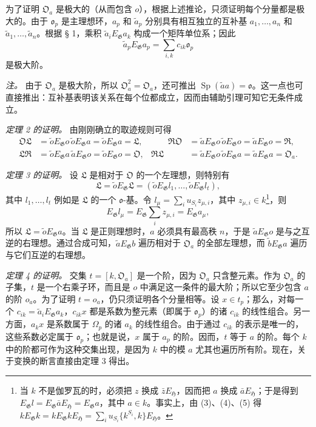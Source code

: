 \documentclass[11pt]{article}
\providecommand{\Gg}{\mathfrak G}
\providecommand{\Hh}{\mathfrak H}
\providecommand{\oo}{\mathfrak o}
\providecommand{\Sp}{\operatorname{Sp}}
\begin{document}
为了证明 \(\mathfrak O_a\) 是极大的（从而包含 \(o\)），根据上述推论，只须证明每个分量都是极大的。由于 \(\oo_p\) 是主理想环，\(a_p\) 和 \(\widetilde a_p\) 分别具有相互独立的互补基 \(a_1,\ldots,a_n\) 和 \(\widetilde a_1,\ldots,\widetilde a_n\)。根据 § 1，乘积 \(\widetilde a_iE_\Gg a_k\) 构成一个矩阵单位系；因此
\[
\widetilde a_pE_\Gg a_p=\sum_{i,k}c_{ik}\oo_p
\]
是极大阶。

\emph{注。} 由于 \(\mathfrak O_a\) 是极大阶，所以 \(\mathfrak O_a^2=\mathfrak O_a\)，还可推出 \(\Sp(\widetilde a a)=\oo\)。这一点也可直接推出：互补基表明该关系在每个位都成立，因而由辅助引理可知它无条件成立。

\medskip
\noindent\emph{定理 2 的证明。} 由刚刚确立的取迹规则可得
\[
\begin{aligned}
\mathfrak O\mathfrak L
 &=\widetilde oE_\Gg o\,\widetilde oE_\Gg a
 =\widetilde oE_\Gg a=\mathfrak L,
&\qquad
\mathfrak R\mathfrak O
 &=\widetilde aE_\Gg o\,\widetilde oE_\Gg o
 =\widetilde aE_\Gg o=\mathfrak R,\\
\mathfrak L\mathfrak R
 &=\widetilde oE_\Gg a\,\widetilde aE_\Gg o
 =\widetilde oE_\Gg o=\mathfrak O,
&
\mathfrak R\mathfrak L
 &=\widetilde aE_\Gg o\,\widetilde oE_\Gg a
 =\widetilde aE_\Gg a=\mathfrak O_a.
\end{aligned}
\]

\medskip
\noindent\emph{定理 3 的证明。} 设 \(\mathfrak L\) 是相对于 \(\mathfrak O\) 的一个左理想，则特别有
\[
\mathfrak L=\widetilde oE_\Gg\mathfrak L
 =(\widetilde oE_\Gg l_1,\ldots,\widetilde oE_\Gg l_t),
\]
其中 \(l_1,\ldots,l_t\) 例如是 \(\mathfrak L\) 的一个 \(\oo\)-基。令 \(l_\mu=\sum_i u_{S_i}z_{\mu,i}\)，其中 \(z_{\mu,i}\in k\)\footnote{当 \(k\) 不是伽罗瓦的时，必须把 \(z\) 换成 \(\bar zE_\Hh\)，因而把 \(a\) 换成 \(\bar aE_\Hh\)；于是得到 \(E_\Gg l=E_\Gg\bar aE_\Hh=E_\Gg a\)，其中 \(a\in k\)。事实上，由 (3)、(4)、(5) 得 \(kE_\Gg k=kE_\Gg kE_\Hh=\sum_i u_{S_i}\{k^{S_i},k\}E_\Hh\)。}，则
\[
E_\Gg l_\mu=E_\Gg\sum_i z_{\mu,i}=E_\Gg a_\mu,
\]
所以 \(\mathfrak L=\widetilde oE_\Gg a\)。当 \(\mathfrak L\) 是正则理想时，\(a\) 必须具有最高秩 \(n\)，于是 \(\widetilde aE_\Gg o\) 是与之互逆的右理想。通过合成可知，\(\widetilde aE_\Gg b\) 遍历相对于 \(\mathfrak O_a\) 的全部左理想，而 \(\widetilde bE_\Gg a\) 遍历与它们互逆的右理想。

\medskip
\noindent\emph{定理 4 的证明。} 交集 \(t=[k,\mathfrak O_a]\) 是一个阶，因为 \(\mathfrak O_a\) 只含整元素。作为 \(\mathfrak O_a\) 的子集，\(t\) 是一个右乘子环，而且是 \(o\) 中满足这一条件的最大阶；所以它至少包含 \(a\) 的阶 \(o_a\)。为了证明 \(t=o_a\)，仍只须证明各个分量相等。设 \(x\in t_p\)；那么，对每一个 \(c_{ik}=\widetilde a_iE_\Gg a_k\)，\(c_{ik}x\) 都是系数为整元素（即属于 \(\oo_p\)）的诸 \(c_{ik}\) 的线性组合。另一方面，\(a_kx\) 是系数属于 \(\Omega_p\) 的诸 \(a_k\) 的线性组合。由于通过 \(c_{ik}\) 的表示是唯一的，这些系数必定属于 \(\oo_p\)；也就是说，\(x\) 属于 \(a_p\) 的阶。因而，\(t\) 等于 \(a\) 的阶。每个 \(k\) 中的阶都可作为这种交集出现，是因为 \(k\) 中的模 \(a\) 尤其也遍历所有阶。现在，关于变换的断言直接由定理 3 得出。
\end{document}
